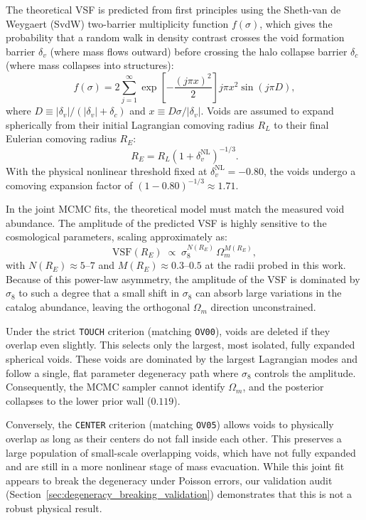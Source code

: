 \documentclass[12pt]{report}
\begin{document}
The theoretical VSF is predicted from first principles using the Sheth-van de Weygaert (SvdW) two-barrier multiplicity function $f(\sigma)$, which gives the probability that a random walk in density contrast crosses the void formation barrier $\delta_v$ (where mass flows outward) before crossing the halo collapse barrier $\delta_c$ (where mass collapses into structures):
\begin{equation}
    f(\sigma) = 2 \sum_{j=1}^{\infty} \exp\left[-\frac{(j\pi x)^2}{2}\right] j\pi x^2 \sin(j\pi D)
    \label{eq:svdw_multiplicity},
\end{equation}
where $D \equiv |\delta_v|/(|\delta_v| + \delta_c)$ and $x \equiv D\sigma/|\delta_v|$. Voids are assumed to expand spherically from their initial Lagrangian comoving radius $R_L$ to their final Eulerian comoving radius $R_E$:
\begin{equation}
    R_E = R_L (1 + \delta_v^{\mathrm{NL}})^{-1/3}
    \label{eq:eulerian_mapping}.
\end{equation}
With the physical nonlinear threshold fixed at $\delta_v^{\mathrm{NL}} = -0.80$, the voids undergo a comoving expansion factor of $(1 - 0.80)^{-1/3} \approx 1.71$. 

In the joint MCMC fits, the theoretical model must match the measured void abundance. The amplitude of the predicted VSF is highly sensitive to the cosmological parameters, scaling approximately as:
\begin{equation}
    \mathrm{VSF}(R_E) \;\propto\; \sigma_8^{N(R_E)} \, \Omega_m^{M(R_E)}
    \label{eq:vsf_scaling},
\end{equation}
with $N(R_E) \approx 5$--$7$ and $M(R_E) \approx 0.3$--$0.5$ at the radii probed in this work. Because of this power-law asymmetry, the amplitude of the VSF is dominated by $\sigma_8$ to such a degree that a small shift in $\sigma_8$ can absorb large variations in the catalog abundance, leaving the orthogonal $\Omega_m$ direction unconstrained. 

Under the strict \texttt{TOUCH} criterion (matching \texttt{OV00}), voids are deleted if they overlap even slightly. This selects only the largest, most isolated, fully expanded spherical voids. These voids are dominated by the largest Lagrangian modes and follow a single, flat parameter degeneracy path where $\sigma_8$ controls the amplitude. Consequently, the MCMC sampler cannot identify $\Omega_m$, and the posterior collapses to the lower prior wall ($0.119$).

Conversely, the \texttt{CENTER} criterion (matching \texttt{OV05}) allows voids to physically overlap as long as their centers do not fall inside each other. This preserves a large population of small-scale overlapping voids, which have not fully expanded and are still in a more nonlinear stage of mass evacuation. While this joint fit appears to break the degeneracy under Poisson errors, our validation audit (Section~\ref{sec:degeneracy_breaking_validation}) demonstrates that this is not a robust physical result.
\end{document}
